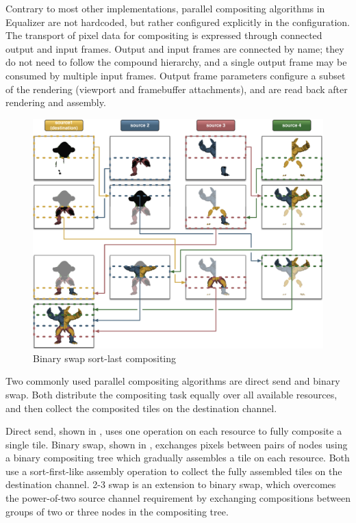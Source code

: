 Contrary to most other implementations, parallel compositing algorithms in
Equalizer are not hardcoded, but rather configured explicitly in the
configuration. The transport of pixel data for compositing is expressed through
connected output and input frames. Output and input frames are connected by
name; they do not need to follow the compound hierarchy, and a single output
frame may be consumed by multiple input frames. Output frame parameters
configure a subset of the rendering (viewport and framebuffer attachments), and
are read back after rendering and assembly.

\begin{figure}[h!t]\center
 \includegraphics[width=0.9\columnwidth]{images/binarySwap}
 {\caption{\label{fBS}Binary swap sort-last compositing}}
\end{figure}

Two commonly used parallel compositing algorithms are direct send and binary
swap. Both distribute the compositing task equally over all available
resources, and then collect the composited tiles on the destination channel.

Direct send, shown in , uses one operation on each resource to
fully composite a single tile. Binary swap, shown in , exchanges
pixels between pairs of nodes using a binary compositing tree which gradually
assembles a tile on each resource. Both use a sort-first-like assembly
operation to collect the fully assembled tiles on the destination channel. 2-3
swap \cite{Yu:2008:MPV:1413370.1413419} is an extension to binary swap, which
overcomes the power-of-two source channel requirement by exchanging
compositions between groups of two or three nodes in the compositing tree.

